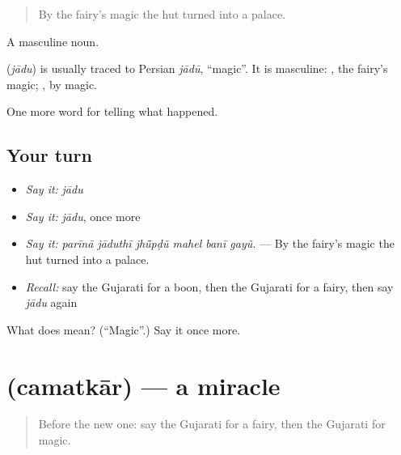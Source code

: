 \begin{quote}
By the fairy's magic the hut turned into a palace.
\end{quote}

A masculine noun.

\begin{cousinweb}
\textbf{} (\emph{jādu}) is usually traced to Persian \emph{jādū}, \textquotedblleft{}magic\textquotedblright{}. It is masculine: \textbf{ }, the fairy's magic; \textbf{}, by magic.
\end{cousinweb}

\begin{grammarlens}[title={What you've built}]
One more word for telling what happened.
\end{grammarlens}

\subsection*{Your turn}
\begin{itemize}
\raggedright
  \item \emph{Say it:} \emph{jādu}
  \item \emph{Say it:} \emph{jādu}, once more
  \item \emph{Say it:} \emph{parīnā jāduthī jhū̃pḍũ mahel banī gayũ.} — By the fairy's magic the hut turned into a palace.
  \item \emph{Recall:} say the Gujarati for a boon, then the Gujarati for a fairy, then say \emph{jādu} again
\end{itemize}

\begin{tcolorbox}[breakable,colback=teal!4,colframe=teal!35!black,title={Before you move on}]
What does  mean? (\textquotedblleft{}Magic\textquotedblright{}.) Say it once more.
\end{tcolorbox}
\section[\texorpdfstring{\gu{ચમત્કાર} (camatkār)}{ચમત્કાર (camatkār)}]{ (camatkār) — a miracle}

\label{lesson:GU-C333-camatkar}



\begin{quote}
Before the new one: say the Gujarati for a fairy, then the Gujarati for magic.
\end{quote}

